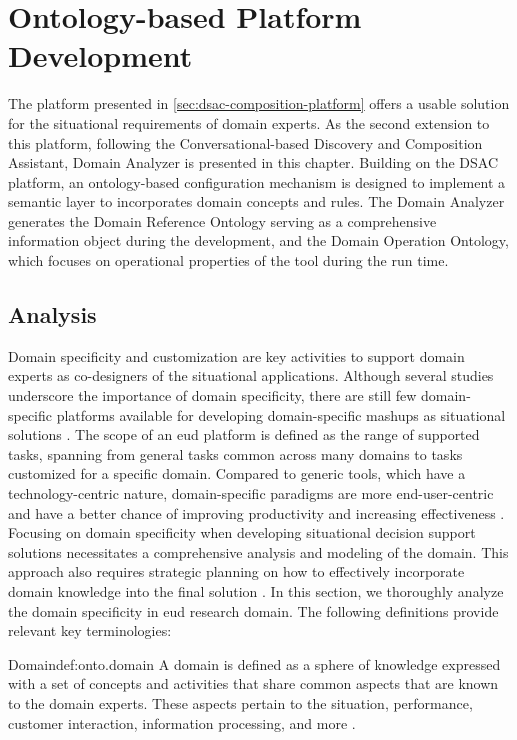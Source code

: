 \hypertarget{sec:dsac-onto}{%
\chapter{Ontology-based Platform Development}\label{sec:dsac-onto}}
The platform presented in \cref{sec:dsac-composition-platform} offers a usable solution for the situational requirements of domain experts. As the second extension to this platform, following the Conversational-based Discovery and Composition Assistant, Domain Analyzer is presented in this chapter. Building on the DSAC platform, an ontology-based configuration mechanism is designed to implement a semantic layer to incorporates domain concepts and rules. The Domain Analyzer generates the Domain Reference Ontology serving as a comprehensive information object during the development, and the Domain Operation Ontology, which focuses on operational properties of the tool during the run time.

\hypertarget{sec:onto.analysis}{%
\section{Analysis}\label{sec:onto.analysis}}

Domain specificity and customization are key activities to support domain experts as co-designers of the situational applications. Although several studies underscore the importance of domain specificity, there are still few domain-specific platforms available for developing domain-specific mashups as situational solutions \autocite{Paterno2017b}. The scope of an \gls{eud} platform is defined as the range of supported tasks, spanning from general tasks common across many domains to tasks customized for a specific domain. Compared to generic tools, which have a technology-centric nature, domain-specific paradigms are more end-user-centric and have a better chance of improving productivity and increasing effectiveness \autocite{Daniel2014a}. Focusing on domain specificity when developing situational decision support solutions necessitates a comprehensive analysis and modeling of the domain. This approach also requires strategic planning on how to effectively incorporate domain knowledge into the final solution \autocite{Soi2014a}.  
In this section, we thoroughly analyze the domain specificity in \gls{eud} research domain. The following definitions provide relevant key terminologies: 

\begin{thesisdefinition}{Domain}{def:onto.domain}
A \gls{domain} is defined as a sphere of knowledge expressed with a set of concepts and activities that share common aspects that are known to the domain experts. These aspects pertain to the situation, performance, customer interaction, information processing, and more \autocite{Chemnitz2017}.
\end{thesisdefinition}


